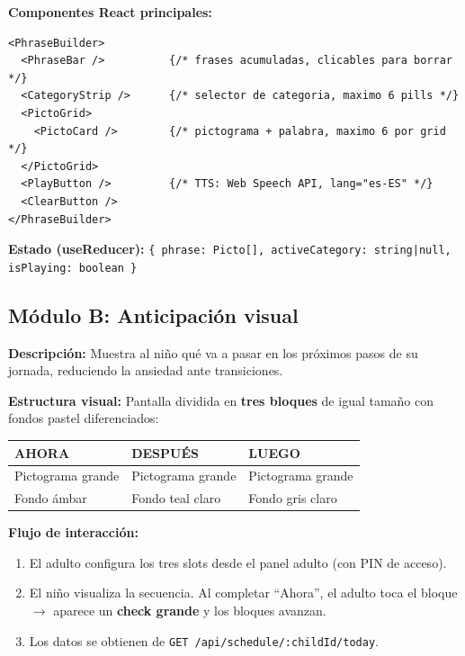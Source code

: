 \documentclass[12pt, a4paper]{article}
\begin{document}
\textbf{Componentes React principales:}

\begin{cajatecnica}[]
\begin{lstlisting}
<PhraseBuilder>
  <PhraseBar />          {/* frases acumuladas, clicables para borrar */}
  <CategoryStrip />      {/* selector de categoria, maximo 6 pills */}
  <PictoGrid>
    <PictoCard />        {/* pictograma + palabra, maximo 6 por grid */}
  </PictoGrid>
  <PlayButton />         {/* TTS: Web Speech API, lang="es-ES" */}
  <ClearButton />
</PhraseBuilder>
\end{lstlisting}
\end{cajatecnica}

\textbf{Estado (useReducer):}
\texttt{\{ phrase: Picto[], activeCategory: string|null, isPlaying: boolean \}}

\subsection{Módulo B: Anticipación visual}

\textbf{Descripción:} Muestra al niño qué va a pasar en los próximos pasos de su jornada, reduciendo la ansiedad ante transiciones.

\textbf{Estructura visual:} Pantalla dividida en \textbf{tres bloques} de igual tamaño con fondos pastel diferenciados:

\begin{tabular}{C{3cm} C{3cm} C{3cm}}
\toprule
\textbf{AHORA} & \textbf{DESPUÉS} & \textbf{LUEGO} \\
\midrule
Pictograma grande & Pictograma grande & Pictograma grande \\
Fondo ámbar & Fondo teal claro & Fondo gris claro \\
\bottomrule
\end{tabular}

\vspace{8pt}
\textbf{Flujo de interacción:}

\begin{enumerate}
  \item El adulto configura los tres slots desde el panel adulto (con PIN de acceso).
  \item El niño visualiza la secuencia. Al completar ``Ahora'', el adulto toca el bloque $\to$ aparece un \textbf{check grande} y los bloques avanzan.
  \item Los datos se obtienen de \texttt{GET /api/schedule/:childId/today}.
\end{enumerate}
\end{document}
